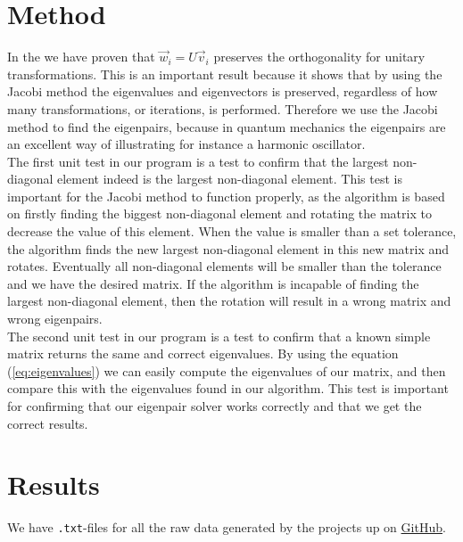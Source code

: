 \documentclass{article}
\begin{document}
\section{Method} \label{sec:Method}

In the  we have proven that $\vec{w}_i = U \vec{v}_i$ preserves the orthogonality for unitary transformations. This is an important result because it shows that by using the Jacobi method the eigenvalues and eigenvectors is preserved, regardless of how many transformations, or iterations, is performed. Therefore we use the Jacobi method to find the eigenpairs, because in quantum mechanics the eigenpairs are an excellent way of illustrating for instance a harmonic oscillator. \\

The first unit test in our program is a test to confirm that the largest non-diagonal element indeed is the largest non-diagonal element. This test is important for the Jacobi method to function properly, as the algorithm is based on firstly finding the biggest non-diagonal element and rotating the matrix to decrease the value of this element. When the value is smaller than a set tolerance, the algorithm finds the new largest non-diagonal element in this new matrix and rotates. Eventually all non-diagonal elements will be smaller than the tolerance and we have the desired matrix. If the algorithm is incapable of finding the largest non-diagonal element, then the rotation will result in a wrong matrix and wrong eigenpairs. \\

The second unit test in our program is a test to confirm that a known simple matrix returns the same and correct eigenvalues. By using the equation (\ref{eq:eigenvalues}) we can easily compute the eigenvalues of our matrix, and then compare this with the eigenvalues found in our algorithm. This test is important for confirming that our eigenpair solver works correctly and that we get the correct results. \\


\vspace{1cm}

\section{Results} \label{sec:Results}

   We have \texttt{.txt}-files for all the raw data generated by the projects up on \href{https://github.com/Erikbgram/Fys3150}{GitHub}. \\
\end{document}
